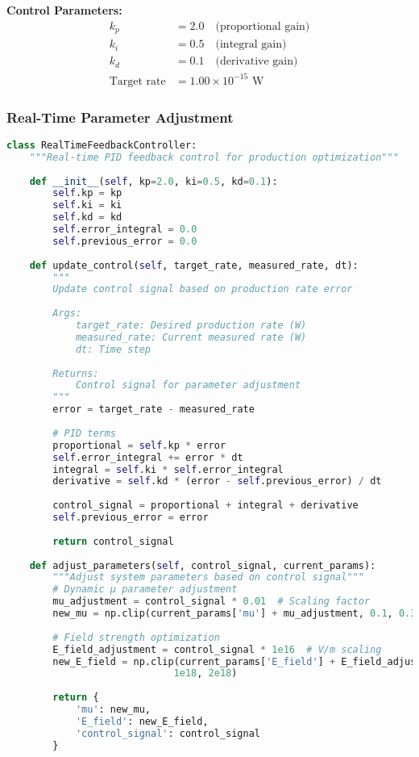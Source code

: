 \documentclass[11pt]{article}
\begin{document}
\textbf{Control Parameters:}
\begin{align}
k_p &= 2.0 \quad \text{(proportional gain)} \\
k_i &= 0.5 \quad \text{(integral gain)} \\
k_d &= 0.1 \quad \text{(derivative gain)} \\
\text{Target rate} &= 1.00 \times 10^{-15} \text{ W}
\end{align}

\subsubsection{Real-Time Parameter Adjustment}
\begin{lstlisting}[language=Python, caption=PID Feedback Control Implementation]
class RealTimeFeedbackController:
    """Real-time PID feedback control for production optimization"""
    
    def __init__(self, kp=2.0, ki=0.5, kd=0.1):
        self.kp = kp
        self.ki = ki
        self.kd = kd
        self.error_integral = 0.0
        self.previous_error = 0.0
        
    def update_control(self, target_rate, measured_rate, dt):
        """
        Update control signal based on production rate error
        
        Args:
            target_rate: Desired production rate (W)
            measured_rate: Current measured rate (W)
            dt: Time step
            
        Returns:
            Control signal for parameter adjustment
        """
        error = target_rate - measured_rate
        
        # PID terms
        proportional = self.kp * error
        self.error_integral += error * dt
        integral = self.ki * self.error_integral
        derivative = self.kd * (error - self.previous_error) / dt
        
        control_signal = proportional + integral + derivative
        self.previous_error = error
        
        return control_signal
        
    def adjust_parameters(self, control_signal, current_params):
        """Adjust system parameters based on control signal"""
        # Dynamic μ parameter adjustment
        mu_adjustment = control_signal * 0.01  # Scaling factor
        new_mu = np.clip(current_params['mu'] + mu_adjustment, 0.1, 0.3)
        
        # Field strength optimization
        E_field_adjustment = control_signal * 1e16  # V/m scaling
        new_E_field = np.clip(current_params['E_field'] + E_field_adjustment, 
                             1e18, 2e18)
        
        return {
            'mu': new_mu,
            'E_field': new_E_field,
            'control_signal': control_signal
        }
\end{lstlisting}
\end{document}
